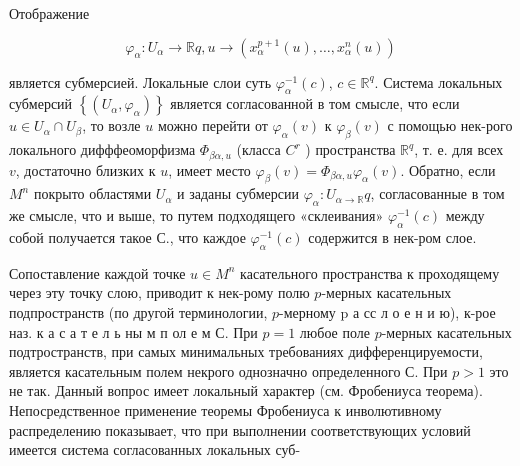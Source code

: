 \documentclass[10pt]{article}
\begin{document}
Отображение



\[

\varphi_{\alpha}: U_{\alpha} \longrightarrow \mathbb{R} q, u \longrightarrow\left(x_{\alpha}^{p+1}(u), \ldots, x_{\alpha}^{n}(u)\right)

\]



является субмерсией. Локальные слои суть $\varphi_{\alpha}^{-1}(c)$, $c \in \mathbb{R}^{q}$. Система локальных субмерсий $\left\{\left(U_{\alpha}, \varphi_{\alpha}\right)\right\}$ является согласованной в том смысле, что если $u \in U_{\alpha} \cap U_{\beta}$, то возле $u$ можно перейти от $\varphi_{\alpha}(v)$ к $\varphi_{\beta}(v)$ с помощью нек-рого локального дифффеоморфизма $\Phi_{\beta \alpha, u}$ (класса $C^{r}$ ) пространства $\mathbb{R}^{q}$, т. е. для всех $v$, достаточно близких к $u$, имеет место $\varphi_{\beta}(v)=\Phi_{\beta \alpha, u} \varphi_{\alpha}(v)$. Обратно, если $M^{n}$ покрыто областями $U_{\alpha}$ и заданы субмерсии $\varphi_{\alpha}: U_{\alpha \rightarrow \mathbb{R}} q$, согласованные в том же смысле, что и выше, то путем подходящего «склеивания» $\varphi_{\alpha}^{-1}(c)$ между собой получается такое С., что каждое $\varphi_{\alpha}^{-1}(c)$ содержится в нек-ром слое.



Сопоставление каждой точке $u \in M^{n}$ касательного пространства к проходящему через эту точку слою, приводит к нек-рому полю $p$-мерных касательных подпространств (по другой терминологии, $p$-мерному $\mathrm{p}$ а сс л о е н и ю), к-рое наз. к а с а т е л ь ны м п ол е м С. При $p=1$ любое поле $p$-мерных касательных подтространств, при самых минимальных требованиях дифференцируемости, является касательным полем некрого однозначно определенного С. При $p>1$ это не так. Данный вопрос имеет локальный характер (см. Фробениуса теорема). Непосредственное применение теоремы Фробениуса к инволютивному распределению показывает, что при выполнении соответствующих условий имеется система согласованных локальных суб-
\end{document}
